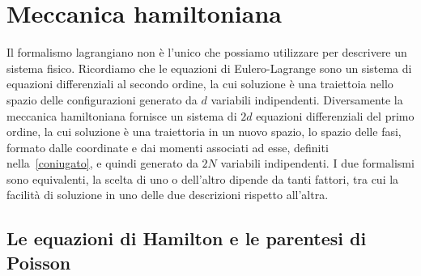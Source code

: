 \section{Meccanica hamiltoniana}

    Il formalismo lagrangiano non è l'unico che possiamo utilizzare per descrivere un sistema fisico. Ricordiamo che le equazioni di Eulero-Lagrange sono un sistema di equazioni differenziali al secondo ordine, la cui soluzione è una traiettoia nello spazio delle configurazioni generato da $d$ variabili indipendenti. Diversamente la meccanica hamiltoniana fornisce un sistema di $2d$ equazioni differenziali del primo ordine, la cui soluzione è una traiettoria in un nuovo spazio, lo spazio delle fasi, formato dalle coordinate e dai momenti associati ad esse, definiti nella~\eqref{coniugato}, e quindi generato da $2N$ variabili indipendenti. I due formalismi sono equivalenti, la scelta di uno o dell'altro dipende da tanti fattori, tra cui la facilità di soluzione in uno delle due descrizioni rispetto all'altra.
    
\subsection{Le equazioni di Hamilton e le parentesi di Poisson}

